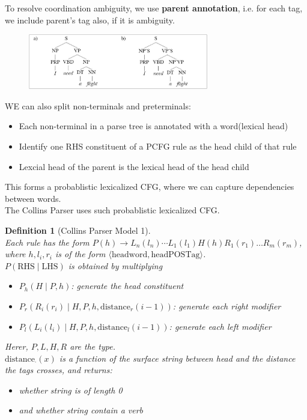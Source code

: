 \documentclass[12pt]{article}
\newtheorem{definition}{Definition}[section]
\theoremstyle{definition}
\begin{document}
To resolve coordination ambiguity, we use \textbf{parent annotation}, i.e. for each tag, we include parent's tag also, if it is ambiguity.
\begin{figure}[h]
\centering
\includegraphics[width=0.7\textwidth]{parentanno.jpg}
\end{figure}
WE can also split non-terminals and preterminals:
\begin{itemize}
	\item Each non-terminal in a parse tree is annotated with a word(lexical head)
	\item Identify one RHS constituent of a  PCFG rule as the head child of that rule
	\item Lexcial head of the parent is the lexical head of the head child
\end{itemize}
This forms a probablistic lexicalized CFG, where we can capture dependencies between words.\\
The Collins Parser uses such probablistic lexicalized CFG.
\begin{definition}[Collins Parser Model 1]
\hfill\\\normalfont Each rule has the form $P(h)\to L_n(l_n)\cdots L_1(l_1)H(h)R_1(r_1)\ldots R_m(r_m)$, where $h, l_i, r_i$ is of the form $\langle \text{headword}, \text{headPOSTag}\rangle$.\\
$P(\text{RHS}\mid \text{LHS})$ is obtained by multiplying
\begin{itemize}
	\item $P_h(H\mid P, h)$: generate the head constituent
	\item $P_r(R_i(r_i)\mid H, P, h, \text{distance}_r(i-1))$: generate each right modifier
	\item $P_l(L_i(l_i)\mid H, P, h, \text{distance}_l(i-1))$: generate each left modifier
\end{itemize}
Herer, $P, L, H, R$ are the type.\\
$\text{distance}_\cdot (x)$ is a function of the surface string between head and the distance the tags crosses, and returns:
\begin{itemize}
	\item whether string is of length 0
	\item and whether string contain a verb
\end{itemize}
\end{definition}
\end{document}
